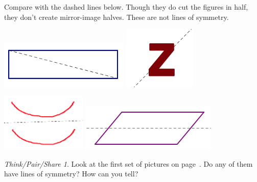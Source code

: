\documentclass[12pt, reqno]{amsart}
\theoremstyle{remark}
\newtheorem*{thinkpair*}{Think/Pair/Share}
\theoremstyle{definition}
\numberwithin{equation}{section}  %
\begin{document}
\bigskip
\noindent
Compare with the dashed lines below.  Though they do cut the figures in half, they don't create mirror-image halves.  These are not lines of symmetry.

\begin{center}
\includegraphics[height=2.25cm]{notlinesym1}
\qquad \qquad
\includegraphics[height=3cm]{notlinesym2}


\includegraphics[height=2.75cm]{notlinesym3}
\qquad \qquad
\includegraphics[height=2.25cm]{notlinesym4}
\end{center}

\bigskip

\begin{thinkpair*}
Look at the first set of pictures on page~\pageref{pics:symm}.  Do any of them have lines of symmetry?  How can you tell?
\end{thinkpair*}

\newpage
\end{document}
